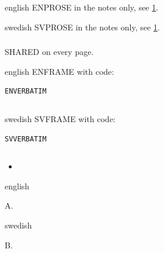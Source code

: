 \mode*

\section{}\label{sec:bilingual-test}

\begin{onlyin}{english} %
ENPROSE in the notes only, see \cref{sec:bilingual-test}.
\end{onlyin}
\begin{onlyin}{swedish}
SVPROSE in the notes only, see \cref{sec:bilingual-test}.
\end{onlyin}

\begin{frame}[fragile]
  \frametitle{}
  SHARED on every page.

  \begin{onlyin}{english}
ENFRAME with code:
\begin{verbatim}
ENVERBATIM
\end{verbatim}
\inputminted{python}{hello.py}
\end{onlyin}
  \begin{onlyin}{swedish}
SVFRAME with code:
\begin{verbatim}
SVVERBATIM
\end{verbatim}
\inputminted{python}{hello.py}
\end{onlyin}

  \begin{exercise}
    \begin{itemize}
      \item {}
    \end{itemize}
  \end{exercise}
\end{frame}

\begin{frame}[fragile]
\begin{onlyin}{english}
\begin{exercise}[ENBLOCKED]\label{ex:same}
A.
\end{exercise}
\end{onlyin}
\begin{onlyin}{swedish}
\begin{exercise}[SVBLOCKED]\label{ex:same}
B.
\end{exercise}
\end{onlyin}
\end{frame}

